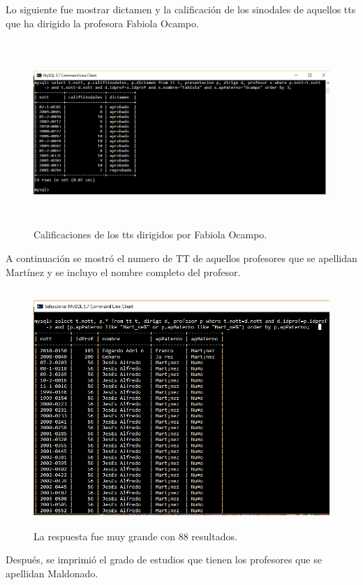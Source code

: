 \documentclass[12pt, titlepage]{article}
\begin{document}
	Lo siguiente fue mostrar dictamen y la calificación de los sinodales de aquellos tts que ha dirigido la profesora Fabiola Ocampo.
	\begin{figure}[H]
		\begin{center}
			\includegraphics[width=16cm, height=7cm]{img/tres.png}
			\caption{Calificaciones de los tts dirigidos por Fabiola Ocampo.}
			\label{fig:tres}
		\end{center}
	\end{figure}
	A continuación se mostró el numero de TT de aquellos profesores que se apellidan Martínez y se incluyo el nombre completo del profesor.
	\begin{figure}[H]
		\begin{center}
			\includegraphics[width=16cm, height=9cm]{img/cuatro.png}
			\caption{La respuesta fue muy grande con 88 resultados.}
			\label{fig:ejercicio5}
		\end{center}
	\end{figure}
	Después, se imprimió el grado de estudios que tienen los profesores que se apellidan Maldonado.
\end{document}
